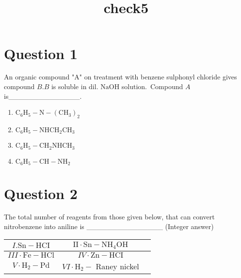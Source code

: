 \documentclass{article}
\title{check5 }
\begin{document}
                    \maketitle
                    \section*{Question 1}
An organic compound "A" on treatment with benzene sulphonyl chloride gives compound \(B . B\) is soluble in dil. \(\mathrm{NaOH}\) solution. Compound \(A\) is______________. 
\begin{enumerate}[label=(\alph*)]
\item \(\mathrm{C}_6 \mathrm{H}_5-\mathrm{N}-\left(\mathrm{CH}_3\right)_2\)
\item \(\mathrm{C}_6 \mathrm{H}_5-\mathrm{NHCH}_2 \mathrm{CH}_3\)
\item \(\mathrm{C}_6 \mathrm{H}_5-\mathrm{CH}_2 \mathrm{NHCH}_3\)
\item \(\mathrm{C}_6 \mathrm{H}_5-\mathrm{CH}-\mathrm{NH}_2\)
\end{enumerate}
\newpage
\section*{Question 2}
The total number of reagents from those given below, that can convert nitrobenzene into aniline is _______________ (Integer answer)\begin{tabular}{|c|c|c|}
\hline
\(I . \mathrm{Sn}-\mathrm{HCI}\) & \(\mathrm{II} \cdot \mathrm{Sn}-\mathrm{NH}_4 \mathrm{OH}\) \\
\hline
\(I I I \cdot \mathrm{Fe}-\mathrm{HCl}\) & \(I V \cdot \mathrm{Zn}-\mathrm{HCI}\) \\
\hline
\(V \cdot \mathrm{H}_2-\mathrm{Pd}\) & \(V I \cdot \mathrm{H}_2-\) Raney nickel \\
\hline
\end{tabular}

\begin{enumerate}[label=(\alph*)]
\end{enumerate}
\newpage
\end{document}

